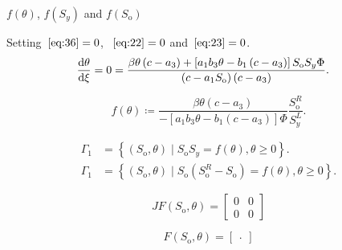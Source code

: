 \documentclass[
    8pt,
    aspectratio=1610,
    c,
    intlimits,
    leqno,
    professionalfonts,
]{beamer}
\begin{document}
\begin{frame}
	\frametitle{\secname}

	\begin{block}{$f\left(\theta\right)$,
			$f\left(S_{y}\right)$ and $f\left(S_{\text{o}}\right)$}

		Setting~$\eqref{eq:36}=0$, ~$\eqref{eq:22}=0$
		and~$\eqref{eq:23}=0$.
		\begin{align*}
			\diff{\theta}{\xi}=
			0
			 & =
			\frac{
				\beta\theta
				\left(c-a_{3}\right)+
				\left[
					a_{1}
					b_{3}
					\theta-
					b_{1}
					\left(c-a_{3}\right)
					\right]
				S_{\text{o}}
				S_{y}
				\Phi}{
				\left(c-a_{1}S_{\text{o}}\right)
				\left(c-a_{3}\right)
			}.
		\end{align*}

		\begin{equation*}
			f\left(\theta\right)\coloneqq
			\frac{
				\beta\theta\left(c-a_{3}\right)}{
				-\left[
					a_{1}
					b_{3}
					\theta-
					b_{1}
					\left(c-a_{3}\right)
					\right]
				\Phi
			}
			\frac{S^{R}_{\text{o}}}{S^{L}_{y}}.
		\end{equation*}

		\begin{align*}
			\Gamma_{1} & =
			\left\{
			\left(S_{\text{o}},\theta\right)\mid
			S_{\text{o}}
			S_{y}=
			f\left(\theta\right),\theta\geq0
			\right\}.      \\
			\Gamma_{1} & =
			\left\{
			\left(S_{\text{o}},\theta\right)\mid
			S_{\text{o}}
			\left(
			S^{R}_{\text{o}}-
			S_{\text{o}}
			\right)=
			f\left(\theta\right),\theta\geq0
			\right\}.
		\end{align*}

		\begin{equation*}
			JF\left(S_{\text{o}},\theta\right)=
			\begin{bmatrix}
				0 & 0 \\
				0 & 0
			\end{bmatrix}
		\end{equation*}

		\begin{equation*}
			F\left(S_{\text{o}},\theta\right)=
			\begin{bmatrix}
				.
			\end{bmatrix}
		\end{equation*}
	\end{block}
\end{frame}
\end{document}

